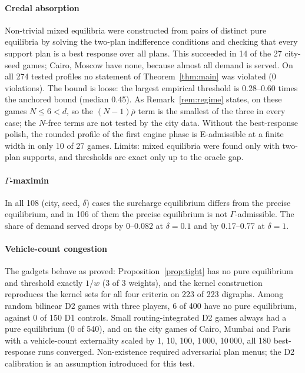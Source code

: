 \documentclass[preprint,11pt]{elsarticle}
\theoremstyle{definition}
\theoremstyle{remark}
\begin{document}
\paragraph{Credal absorption} Non-trivial mixed equilibria were constructed from pairs of distinct pure equilibria by solving the two-plan indifference conditions and checking that every support plan is a best response over all plans. This succeeded in 14 of the 27 city-seed games; Cairo, Moscow have none, because almost all demand is served. On all 274 tested profiles no statement of Theorem~\ref{thm:main} was violated (0 violations). The bound is loose: the largest empirical threshold is 0.28--0.60 times the anchored bound (median 0.45). As Remark~\ref{rem:regime} states, on these games $N\le6<d$, so the $(N-1)\bar\rho$ term is the smallest of the three in every case; the $N$-free terms are not tested by the city data. Without the best-response polish, the rounded profile of the first engine phase is E-admissible at a finite width in only 10 of 27 games. Limits: mixed equilibria were found only with two-plan supports, and thresholds are exact only up to the oracle gap.

\paragraph{$\Gamma$-maximin} In all 108 (city, seed, $\delta$) cases the surcharge equilibrium differs from the precise equilibrium, and in 106 of them the precise equilibrium is not $\Gamma$-admissible. The share of demand served drops by 0--0.082 at $\delta=0.1$ and by 0.17--0.77 at $\delta=1$.

\paragraph{Vehicle-count congestion} The gadgets behave as proved: Proposition~\ref{prop:tight} has no pure equilibrium and threshold exactly $1/w$ (3 of 3 weights), and the kernel construction reproduces the kernel sets for all four criteria on 223 of 223 digraphs. Among random bilinear D2 games with three players, 6 of 400 have no pure equilibrium, against 0 of 150 D1 controls. Small routing-integrated D2 games always had a pure equilibrium (0 of 540), and on the city games of Cairo, Mumbai and Paris with a vehicle-count externality scaled by 1, 10, 100, 1\,000, 10\,000, all 180 best-response runs converged. Non-existence required adversarial plan menus; the D2 calibration is an assumption introduced for this test.
\end{document}
